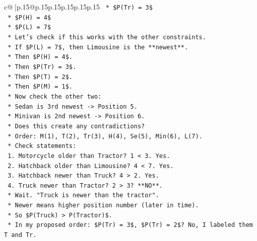 \documentclass{article}
\begin{document}
{\begin{supertabular}{c@{$\;$}|p{.15\linewidth}@{}p{.15\linewidth}p{.15\linewidth}p{.15\linewidth}p{.15\linewidth}p{.15\linewidth}}
{{{\texttt{                        *   \$P(Tr) = 3\$} \\
\texttt{                        *   \$P(H) = 4\$} \\
\texttt{                        *   \$P(L) = 7\$} \\
\texttt{                    *   Let's check if this works with the other constraints.} \\
\texttt{                    *   If \$P(L) = 7\$, then Limousine is the **newest**.} \\
\texttt{                    *   Then \$P(H) = 4\$.} \\
\texttt{                    *   Then \$P(Tr) = 3\$.} \\
\texttt{                    *   Then \$P(T) = 2\$.} \\
\texttt{                    *   Then \$P(M) = 1\$.} \\
\texttt{                    *   Now check the other two:} \\
\texttt{                        *   Sedan is 3rd newest {-}> Position 5.} \\
\texttt{                        *   Minivan is 2nd newest {-}> Position 6.} \\
\texttt{                    *   Does this create any contradictions?} \\
\texttt{                        *   Order: M(1), T(2), Tr(3), H(4), Se(5), Min(6), L(7).} \\
\texttt{                        *   Check statements:} \\
\texttt{                            1.  Motorcycle older than Tractor? 1 < 3. Yes.} \\
\texttt{                            2.  Hatchback older than Limousine? 4 < 7. Yes.} \\
\texttt{                            3.  Hatchback newer than Truck? 4 > 2. Yes.} \\
\texttt{                            4.  Truck newer than Tractor? 2 > 3? **NO**.} \\
\texttt{                            *   Wait. "Truck is newer than the tractor".} \\
\texttt{                            *   Newer means higher position number (later in time).} \\
\texttt{                            *   So \$P(Truck) > P(Tractor)\$.} \\
\texttt{                            *   In my proposed order: \$P(Tr) = 3\$, \$P(Tr) = 2\$? No, I labeled them T and Tr.} \\
}}}
\end{supertabular}}
\end{document}
